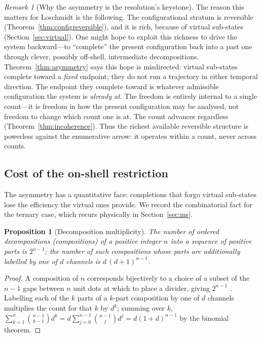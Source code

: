 \documentclass[11pt,a4paper]{article}
\theoremstyle{thmstyle}
\newtheorem{proposition}[theorem]{Proposition}
\theoremstyle{definition}
\theoremstyle{remark}
\newtheorem{remark}[theorem]{Remark}
\begin{document}
\begin{remark}[Why the asymmetry is the resolution's keystone]
\label{rem:keystone}
The reason this matters for Loschmidt is the following. The configurational
stratum is reversible (Theorem~\ref{thm:configreversible}), and it is rich,
because of virtual sub-states (Section~\ref{sec:virtual}). One might hope to
exploit this richness to drive the system backward---to ``complete''
the present configuration back into a past one through clever, possibly
off-shell, intermediate decompositions. Theorem~\ref{thm:asymmetry} says
this hope is misdirected: virtual sub-states complete toward a \emph{fixed}
endpoint; they do not run a trajectory in either temporal direction. The
endpoint they complete toward is whatever admissible configuration the
system is \emph{already at}. The freedom is entirely internal to a single
count---it is freedom in how the present configuration may be analysed,
not freedom to change which count one is at. The count advances regardless
(Theorem~\ref{thm:incoherence}). Thus the richest available reversible
structure is powerless against the enumerative arrow: it operates within a
count, never across counts.
\end{remark}

\subsection{Cost of the on-shell restriction}
\label{sec:cost}

The asymmetry has a quantitative face: completions that forgo virtual
sub-states lose the efficiency the virtual ones provide. We record the
combinatorial fact for the ternary case, which recurs physically in
Section~\ref{sec:ms}.

\begin{proposition}[Decomposition multiplicity]
\label{prop:multiplicity}
The number of ordered decompositions (compositions) of a positive integer
$n$ into a sequence of positive parts is $2^{n-1}$; the number of such
compositions whose parts are additionally labelled by one of $d$ channels
is $d\,(d+1)^{n-1}$.
\end{proposition}

\begin{proof}
A composition of $n$ corresponds bijectively to a choice of a subset of the
$n-1$ gaps between $n$ unit dots at which to place a divider, giving
$2^{n-1}$ \citep{stanley2011}. Labelling each of the $k$ parts of a
$k$-part composition by one of $d$ channels multiplies the count for that
$k$ by $d^{k}$; summing over $k$,
$\sum_{k=1}^{n}\binom{n-1}{k-1}d^{k}=d\sum_{j=0}^{n-1}\binom{n-1}{j}d^{j}
=d(1+d)^{n-1}$ by the binomial theorem.
\end{proof}
\end{document}
